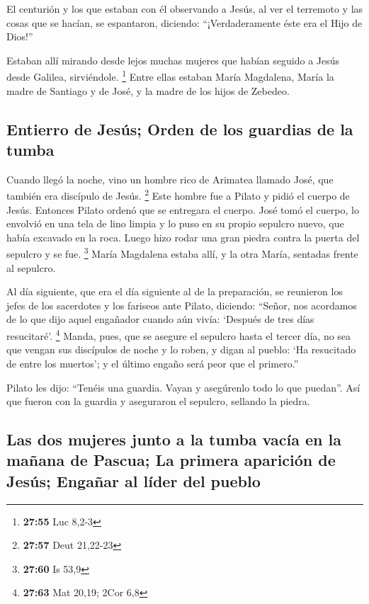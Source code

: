  El centurión y los que estaban con él observando a
Jesús, al ver el terremoto y las cosas que se hacían, se espantaron,
diciendo: ``¡Verdaderamente éste era el Hijo de Dios!''

 Estaban allí mirando desde lejos muchas mujeres que
habían seguido a Jesús desde Galilea, sirviéndole. \footnote{\textbf{27:55}
  Luc 8,2-3}  Entre ellas estaban María Magdalena, María
la madre de Santiago y de José, y la madre de los hijos de Zebedeo.

\hypertarget{entierro-de-jesuxfas-orden-de-los-guardias-de-la-tumba}{%
\subsection{Entierro de Jesús; Orden de los guardias de la
tumba}\label{entierro-de-jesuxfas-orden-de-los-guardias-de-la-tumba}}

 Cuando llegó la noche, vino un hombre rico de Arimatea
llamado José, que también era discípulo de Jesús. \footnote{\textbf{27:57}
  Deut 21,22-23}  Este hombre fue a Pilato y pidió el
cuerpo de Jesús. Entonces Pilato ordenó que se entregara el cuerpo.
 José tomó el cuerpo, lo envolvió en una tela de lino
limpia  y lo puso en su propio sepulcro nuevo, que había
excavado en la roca. Luego hizo rodar una gran piedra contra la puerta
del sepulcro y se fue. \footnote{\textbf{27:60} Is 53,9} 
María Magdalena estaba allí, y la otra María, sentadas frente al
sepulcro.

 Al día siguiente, que era el día siguiente al de la
preparación, se reunieron los jefes de los sacerdotes y los fariseos
ante Pilato,  diciendo: ``Señor, nos acordamos de lo que
dijo aquel engañador cuando aún vivía: `Después de tres días
resucitaré'. \footnote{\textbf{27:63} Mat 20,19; 2Cor 6,8}
 Manda, pues, que se asegure el sepulcro hasta el tercer
día, no sea que vengan sus discípulos de noche y lo roben, y digan al
pueblo: `Ha resucitado de entre los muertos'; y el último engaño será
peor que el primero.''

 Pilato les dijo: ``Tenéis una guardia. Vayan y
asegúrenlo todo lo que puedan''.  Así que fueron con la
guardia y aseguraron el sepulcro, sellando la piedra.

\hypertarget{las-dos-mujeres-junto-a-la-tumba-vacuxeda-en-la-mauxf1ana-de-pascua-la-primera-apariciuxf3n-de-jesuxfas-engauxf1ar-al-luxedder-del-pueblo}{%
\subsection{Las dos mujeres junto a la tumba vacía en la mañana de
Pascua; La primera aparición de Jesús; Engañar al líder del
pueblo}\label{las-dos-mujeres-junto-a-la-tumba-vacuxeda-en-la-mauxf1ana-de-pascua-la-primera-apariciuxf3n-de-jesuxfas-engauxf1ar-al-luxedder-del-pueblo}}

